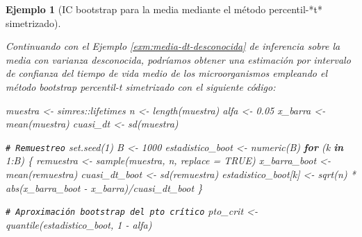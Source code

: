 \documentclass[
]{book}
\newenvironment{Shaded}{\begin{snugshade}}{\end{snugshade}}
\newcommand{\AttributeTok}[1]{\textcolor[rgb]{0.77,0.63,0.00}{#1}}
\newcommand{\CommentTok}[1]{\textcolor[rgb]{0.56,0.35,0.01}{\textit{#1}}}
\newcommand{\ConstantTok}[1]{\textcolor[rgb]{0.00,0.00,0.00}{#1}}
\newcommand{\ControlFlowTok}[1]{\textcolor[rgb]{0.13,0.29,0.53}{\textbf{#1}}}
\newcommand{\DecValTok}[1]{\textcolor[rgb]{0.00,0.00,0.81}{#1}}
\newcommand{\FloatTok}[1]{\textcolor[rgb]{0.00,0.00,0.81}{#1}}
\newcommand{\FunctionTok}[1]{\textcolor[rgb]{0.00,0.00,0.00}{#1}}
\newcommand{\NormalTok}[1]{#1}
\newcommand{\OtherTok}[1]{\textcolor[rgb]{0.56,0.35,0.01}{#1}}
\newcommand{\SpecialCharTok}[1]{\textcolor[rgb]{0.00,0.00,0.00}{#1}}
\theoremstyle{break}
\newtheorem{example}{Ejemplo}[chapter]
\theoremstyle{nonumberplain}
\renewcommand{\CommentTok}[1]{\textcolor[rgb]{0.41,0.41,0.41}{\texttt{#1}}}
\begin{document}
\begin{example}[IC bootstrap para la media mediante el método percentil-*t* simetrizado]
\protect\hypertarget{exm:media-ic-stu-sim}{}\label{exm:media-ic-stu-sim}

Continuando con el Ejemplo \ref{exm:media-dt-desconocida} de inferencia sobre la media con varianza desconocida, podríamos obtener una estimación por intervalo de confianza del tiempo de vida medio de los microorganismos empleando el método bootstrap percentil-\emph{t} simetrizado con el siguiente código:

\begin{Shaded}
\begin{Highlighting}[]
\NormalTok{muestra }\OtherTok{\textless{}{-}}\NormalTok{ simres}\SpecialCharTok{::}\NormalTok{lifetimes}
\NormalTok{n }\OtherTok{\textless{}{-}} \FunctionTok{length}\NormalTok{(muestra)}
\NormalTok{alfa }\OtherTok{\textless{}{-}} \FloatTok{0.05}
\NormalTok{x\_barra }\OtherTok{\textless{}{-}} \FunctionTok{mean}\NormalTok{(muestra)}
\NormalTok{cuasi\_dt }\OtherTok{\textless{}{-}} \FunctionTok{sd}\NormalTok{(muestra)}

\CommentTok{\# Remuestreo}
\FunctionTok{set.seed}\NormalTok{(}\DecValTok{1}\NormalTok{)}
\NormalTok{B }\OtherTok{\textless{}{-}} \DecValTok{1000}
\NormalTok{estadistico\_boot }\OtherTok{\textless{}{-}} \FunctionTok{numeric}\NormalTok{(B)}
\ControlFlowTok{for}\NormalTok{ (k }\ControlFlowTok{in} \DecValTok{1}\SpecialCharTok{:}\NormalTok{B) \{}
\NormalTok{  remuestra }\OtherTok{\textless{}{-}} \FunctionTok{sample}\NormalTok{(muestra, n, }\AttributeTok{replace =} \ConstantTok{TRUE}\NormalTok{)}
\NormalTok{  x\_barra\_boot }\OtherTok{\textless{}{-}} \FunctionTok{mean}\NormalTok{(remuestra)}
\NormalTok{  cuasi\_dt\_boot }\OtherTok{\textless{}{-}} \FunctionTok{sd}\NormalTok{(remuestra)}
\NormalTok{  estadistico\_boot[k] }\OtherTok{\textless{}{-}} \FunctionTok{sqrt}\NormalTok{(n) }\SpecialCharTok{*} \FunctionTok{abs}\NormalTok{(x\_barra\_boot }\SpecialCharTok{{-}}\NormalTok{ x\_barra)}\SpecialCharTok{/}\NormalTok{cuasi\_dt\_boot}
\NormalTok{\}}

\CommentTok{\# Aproximación bootstrap del pto crítico}
\NormalTok{pto\_crit }\OtherTok{\textless{}{-}} \FunctionTok{quantile}\NormalTok{(estadistico\_boot, }\DecValTok{1} \SpecialCharTok{{-}}\NormalTok{ alfa)}


\end{Highlighting}
\end{Shaded}
\end{example}
\end{document}

